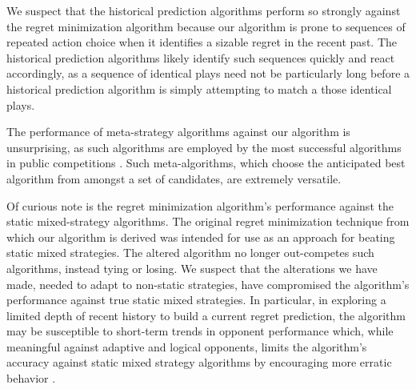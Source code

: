 We suspect that the historical prediction algorithms perform so strongly against the regret minimization algorithm because our algorithm is prone to sequences of repeated action choice when it identifies a sizable regret in the recent past.  The historical prediction algorithms likely identify such sequences quickly and react accordingly, as a sequence of identical plays need not be particularly long before a historical prediction algorithm is simply attempting to match a those identical plays.

The performance of meta-strategy algorithms against our algorithm is unsurprising, as such algorithms are employed by the most successful algorithms in public competitions \cite{rpscomp}.  Such meta-algorithms, which  choose the anticipated best algorithm from amongst a set of candidates, are extremely versatile.

Of curious note is the regret minimization algorithm's performance against the static mixed-strategy algorithms.  The original regret minimization technique from which our algorithm is derived was intended for use as an approach for beating static mixed strategies.  The altered algorithm no longer out-competes such algorithms, instead tying or losing.  We suspect that the alterations we have made, needed to adapt to non-static strategies, have compromised the algorithm's performance against true static mixed strategies.  In particular, in exploring a limited depth of recent history to build a current regret prediction, the algorithm may be susceptible to short-term trends in opponent performance which, while meaningful against adaptive and logical opponents, limits the algorithm's accuracy against static mixed strategy algorithms by encouraging more erratic behavior \cite{noregrets}.  




